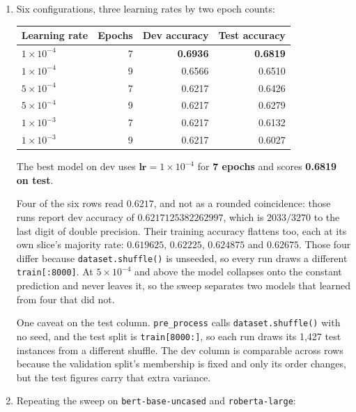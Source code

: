 \documentclass[11pt]{article}
\begin{document}
\begin{enumerate}
  \item Six configurations, three learning rates by two epoch counts:

        \begin{center}
        \begin{tabular}{|l|r|r|r|}
          \hline
          Learning rate & Epochs & Dev accuracy & Test accuracy \\
          \hline
          $1 \times 10^{-4}$ & 7 & \textbf{0.6936} & \textbf{0.6819} \\
          $1 \times 10^{-4}$ & 9 & 0.6566 & 0.6510 \\
          $5 \times 10^{-4}$ & 7 & 0.6217 & 0.6426 \\
          $5 \times 10^{-4}$ & 9 & 0.6217 & 0.6279 \\
          $1 \times 10^{-3}$ & 7 & 0.6217 & 0.6132 \\
          $1 \times 10^{-3}$ & 9 & 0.6217 & 0.6027 \\
          \hline
        \end{tabular}
        \end{center}

        The best model on dev uses $\mathbf{lr} = 1 \times 10^{-4}$ for \textbf{7 epochs} and
        scores \textbf{0.6819 on test}.

        Four of the six rows read $0.6217$, and not as a rounded coincidence: those runs report dev accuracy of $0.6217125382262997$, which is
        $2033/3270$ to the last digit of double precision. Their training accuracy flattens too, each at its own slice's majority rate: $0.619625$,
        $0.62225$, $0.624875$ and $0.62675$. Those four differ because \texttt{dataset.shuffle()}
        is unseeded, so every run draws a different \texttt{train[:8000]}. At
        $5 \times 10^{-4}$ and above the model collapses onto the constant prediction and never
        leaves it, so the sweep separates two models that learned from four that did not.

        One caveat on the test column. \texttt{pre\_process} calls
        \texttt{dataset.shuffle()} with no seed, and the test split is \texttt{train[8000:]}, so
        each run draws its 1{,}427 test instances from a different shuffle. The dev column is
        comparable across rows because the validation split's membership is fixed and only its
        order changes, but the test figures carry that extra variance.

  \item Repeating the sweep on \texttt{bert-base-uncased} and \texttt{roberta-large}:


\end{enumerate}
\end{document}
